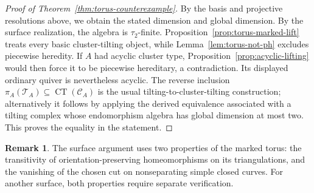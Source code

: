 \documentclass[12pt,a4paper,english,reqno]{amsart}
\theoremstyle{plain}
\theoremstyle{definition}
\newtheorem{rmk}[thm]{Remark}
\numberwithin{equation}{section}
\newcommand{\thmref}[1]{Theorem~\ref{#1}}
\newcommand{\prpref}[1]{Proposition~\ref{#1}}
\newcommand{\lemref}[1]{Lemma~\ref{#1}}
\def\ta{\tau}
\def\calC{{\mathcal C}}
\newcommand{\CT}{\operatorname{CT}}
\begin{document}
\begin{proof}[Proof of \thmref{thm:torus-counterexample}]
By the basis and projective resolutions above, we obtain the stated dimension and global dimension. By the surface realization, the algebra is $\ta_2$-finite. \prpref{prop:torus-marked-lift} treats every basic cluster-tilting object, while \lemref{lem:torus-not-ph} excludes piecewise heredity. If $A$ had acyclic cluster type, \prpref{prop:acyclic-lifting} would then force it to be piecewise hereditary, a contradiction. Its displayed ordinary quiver is nevertheless acyclic. The reverse inclusion $\pi_A(\mathcal T_A)\subseteq\CT(\calC_A)$ is the usual tilting-to-cluster-tilting construction; alternatively it follows by applying the derived equivalence associated with a tilting complex whose endomorphism algebra has global dimension at most two. This proves the equality in the statement.
\end{proof}

\begin{rmk}
The surface argument uses two properties of the marked torus: the transitivity of orientation-preserving homeomorphisms on its triangulations, and the vanishing of the chosen cut on nonseparating simple closed curves. For another surface, both properties require separate verification.
\end{rmk}
\end{document}
